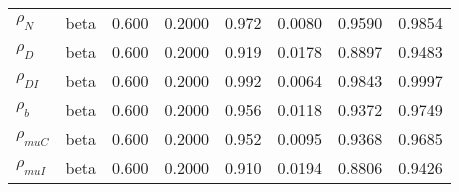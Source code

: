 \begin{center}
\begin{longtable}{llcccccc}
${\rho_N}$ & beta &   0.600 & 0.2000 &   0.972& 0.0080 &  0.9590 &  0.9854 \\ 
${\rho_D}$ & beta &   0.600 & 0.2000 &   0.919& 0.0178 &  0.8897 &  0.9483 \\ 
${\rho_{DI}}$ & beta &   0.600 & 0.2000 &   0.992& 0.0064 &  0.9843 &  0.9997 \\ 
${\rho_b}$ & beta &   0.600 & 0.2000 &   0.956& 0.0118 &  0.9372 &  0.9749 \\ 
${\rho_{muC}}$ & beta &   0.600 & 0.2000 &   0.952& 0.0095 &  0.9368 &  0.9685 \\ 
${\rho_{muI}}$ & beta &   0.600 & 0.2000 &   0.910& 0.0194 &  0.8806 &  0.9426 \\ 
\end{longtable}
 \end{center}
